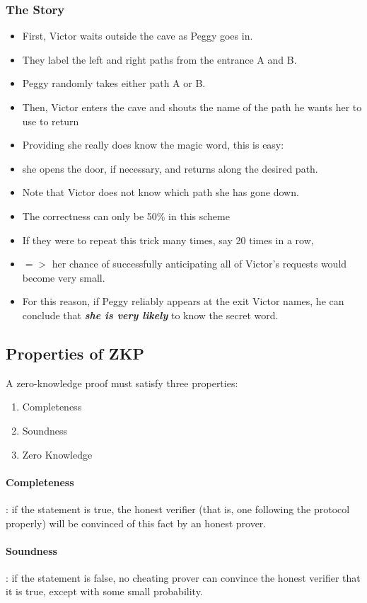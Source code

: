 \documentclass[12pt]{article}
\begin{document}
\subsubsection{The Story}
\begin{itemize}
\item First, Victor waits outside the cave as Peggy goes in.
\item They label the left and right paths from the entrance A and B.
\item Peggy randomly takes either path A or B.
\item Then, Victor enters the cave and shouts the name of the path he wants her to use to return
\item Providing she really does know the magic word, this is easy:
\item she opens the door, if necessary, and returns along the desired path.
\item Note that Victor does not know which path she has gone down.
\item The correctness can only be 50\% in this scheme
\item If they were to repeat this trick many times, say 20 times in a row, 
\item $=>$ her chance of successfully anticipating all of Victor's requests would become very small.
\item For this reason, if Peggy reliably appears at the exit Victor names, he can conclude that \textbf{\textit{\color{blue} she is very likely}} \color{black} to know the secret word.	
\end{itemize}

\subsection{Properties of ZKP}
A zero-knowledge proof must satisfy three properties:
\begin{enumerate}
\item Completeness
\item Soundness
\item Zero Knowledge
\end{enumerate}
\paragraph{Completeness} : if the statement is true, the honest verifier (that is, one following the protocol properly) will be convinced of this fact by an honest prover.
\paragraph{Soundness} : if the statement is false, no cheating prover can convince the honest verifier that it is true, except with some small probability.
\end{document}
